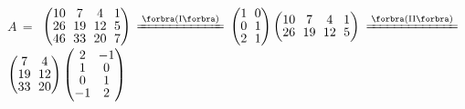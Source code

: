 $A\,=\,$ {\normalsize$\begin{pmatrix} 10 &\hspace{-4pt} 7 &\hspace{-4pt} 4 &\hspace{-4pt} 1 \\[-2pt] 26 &\hspace{-4pt} 19 &\hspace{-4pt} 12 &\hspace{-4pt} 5\\[-2pt] 46 &\hspace{-4pt} 33 &\hspace{-4pt} 20 &\hspace{-4pt} 7\end{pmatrix}$
	{$\xlongequal{\SmallPar{\text{I}}}$}
	$\begin{pmatrix} 1 &\hspace{-4pt} 0\\[-2pt] 0 &\hspace{-4pt} 1\\[-2pt] 2 &\hspace{-4pt} 1\end{pmatrix}\begin{pmatrix} 10 &\hspace{-4pt} 7 &\hspace{-4pt} 4 &\hspace{-4pt} 1\\[-2pt] 26 &\hspace{-4pt} 19 &\hspace{-4pt} 12 &\hspace{-4pt} 5\end{pmatrix}$
	{$\xlongequal{\SmallPar{\text{II}}}$}
	$\begin{pmatrix} 7 &\hspace{-4pt} 4\\[-2pt] 19 &\hspace{-4pt} 12\\[-2pt] 33 &\hspace{-4pt} 20\end{pmatrix}\begin{pmatrix} 2 &\hspace{-4pt} -1\\[-2pt] 1 &\hspace{-4pt} 0\\[-2pt] 0 &\hspace{-4pt} 1\\[-2pt] -1 &\hspace{-4pt} 2\end{pmatrix}$}\par\quad

